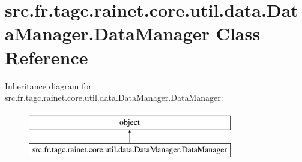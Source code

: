 \hypertarget{classsrc_1_1fr_1_1tagc_1_1rainet_1_1core_1_1util_1_1data_1_1DataManager_1_1DataManager}{\section{src.\-fr.\-tagc.\-rainet.\-core.\-util.\-data.\-Data\-Manager.\-Data\-Manager Class Reference}
\label{classsrc_1_1fr_1_1tagc_1_1rainet_1_1core_1_1util_1_1data_1_1DataManager_1_1DataManager}
}
Inheritance diagram for src.\-fr.\-tagc.\-rainet.\-core.\-util.\-data.\-Data\-Manager.\-Data\-Manager\-:\begin{figure}[H]
\begin{center}
\leavevmode
\includegraphics[height=2.000000cm]{classsrc_1_1fr_1_1tagc_1_1rainet_1_1core_1_1util_1_1data_1_1DataManager_1_1DataManager}
\end{center}
\end{figure}
